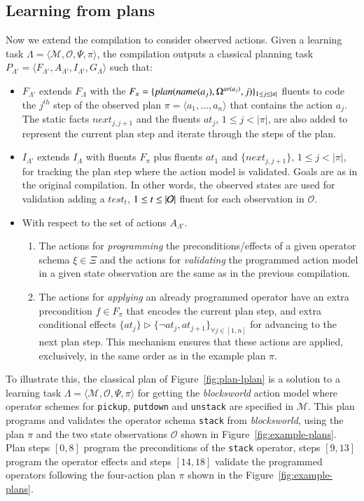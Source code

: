 \documentclass[3p,times]{elsarticle}
\newcommand{\tup}[1]{{\langle #1 \rangle}}
\begin{document}
\subsection{Learning from plans}
Now we extend the compilation to consider observed actions. Given a learning task $\Lambda=\tup{\mathcal{M},\mathcal{O},\Psi,\pi}$, the compilation outputs a classical planning task $P_{\Lambda'}=\tup{F_{\Lambda'},A_{\Lambda'},I_{\Lambda'},G_{\Lambda}}$ such that:
\begin{itemize}
\item $F_{\Lambda'}$ extends $F_{\Lambda}$ with the $F_{\pi}=\{plan(name(a_j),\Omega^{ar(a_j)},j)\}_{\small 1\leq j\leq |\pi|}$ fluents to code the $j^{th}$ step of the observed plan $\pi=\tup{a_1, \ldots, a_n}$ that contains the action $a_j$. The static facts $next_{j,j+1}$ and the fluents $at_j$, {\small $1\leq j< |\pi|$}, are also added to represent the current plan step and iterate through the steps of the plan.
\item $I_{\Lambda'}$ extends $I_{\Lambda}$ with fluents $F_{\pi}$ plus fluents $at_1$ and $\{next_{j,j+1}\}$, {\small $1\leq j<|\pi|$}, for tracking the plan step where the action model is validated. Goals are as in the original compilation. In other words, the observed states are used for validation adding a $test_t$, ${\small 1\leq t\leq |\mathcal{O}|}$ fluent for each observation in $\mathcal{O}$.
\item With respect to the set of actions $A_{\Lambda'}$.
\begin{enumerate}
\item The actions for {\em programming} the preconditions/effects of a given operator schema $\xi\in\Xi$ and the actions for {\em validating} the programmed action model in a given state observation are the same as in the previous compilation.
\item The actions for {\em applying} an already programmed operator have an extra precondition $f\in F_{\pi}$ that encodes the current plan step, and extra conditional effects $\{at_{j}\}\rhd\{\neg at_{j},at_{j+1}\}_{\forall j\in [1,n]}$ for advancing to the next plan step. This mechanism ensures that these actions are applied, exclusively, in the same order as in the example plan $\pi$.
\end{enumerate}
\end{itemize}

To illustrate this, the classical plan of Figure~\ref{fig:plan-lplan} is a solution to a learning task $\Lambda=\tup{\mathcal{M},\mathcal{O},\Psi,\pi}$ for getting the {\em blocksworld} action model where operator schemes for {\tt\small pickup}, {\tt\small putdown} and {\tt\small unstack} are specified in $\mathcal{M}$. This plan programs and validates the operator schema {\tt\small stack} from {\em blocksworld}, using the plan $\pi$ and the two state observations $\mathcal{O}$ shown in Figure~\ref{fig:example-plans}. Plan steps $[0,8]$ program the preconditions of the {\tt\small stack} operator, steps $[9,13]$ program the operator effects and steps $[14,18]$ validate the programmed operators following the four-action plan $\pi$ shown in the Figure~\ref{fig:example-plans}.
\end{document}
